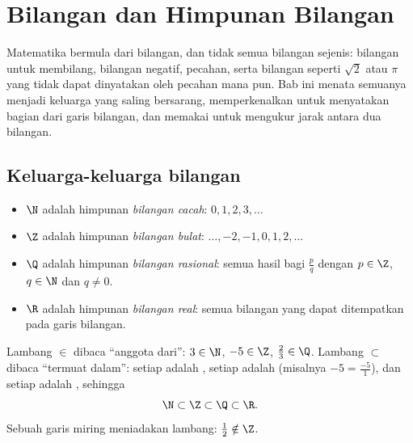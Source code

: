 \chapter{Bilangan dan Himpunan Bilangan}\label{ch:g10:numbers}

Matematika bermula dari bilangan, dan tidak semua bilangan sejenis:
bilangan untuk membilang, bilangan negatif, pecahan, serta bilangan seperti
$\sqrt 2$ atau $\pi$ yang tidak dapat dinyatakan oleh pecahan mana pun. Bab
ini menata semuanya menjadi keluarga yang saling bersarang, memperkenalkan
 untuk menyatakan bagian dari garis bilangan, dan memakai  untuk mengukur jarak antara dua bilangan.

\section{Keluarga-keluarga bilangan}

\begin{definition}\label{def:g10:numbers:sets}
\begin{itemize}
  \item $\N$ adalah himpunan \emph{bilangan cacah}:
        $0, 1, 2, 3, \dots$
  \item $\Z$ adalah himpunan \emph{bilangan bulat}:
        $\dots, -2, -1, 0, 1, 2, \dots$
  \item $\Q$ adalah himpunan \emph{bilangan rasional}:
        semua hasil bagi $\frac{p}{q}$ dengan $p \in \Z$, $q \in \N$ dan
        $q \neq 0$.
  \item $\R$ adalah himpunan \emph{bilangan real}: semua
        bilangan yang dapat ditempatkan pada garis bilangan.
\end{itemize}
\end{definition}

\begin{notation}
Lambang $\in$ dibaca ``anggota dari'': $3 \in \N$, $-5 \in \Z$,
$\frac23 \in \Q$. Lambang $\subset$ dibaca ``termuat dalam'': setiap
 adalah , setiap  adalah  (misalnya $-5 = \frac{-5}{1}$), dan setiap 
adalah , sehingga
\[
\N \subset \Z \subset \Q \subset \R .
\]
Sebuah garis miring meniadakan lambang: $\frac12 \notin \Z$.
\end{notation}

